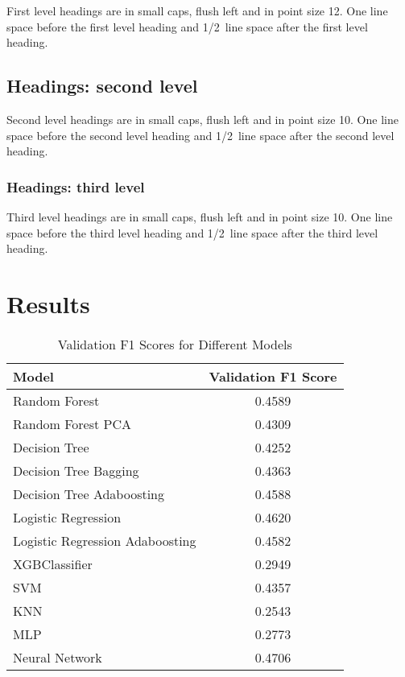 \documentclass{article} %
\begin{document}
First level headings are in small caps,
flush left and in point size 12. One line space before the first level
heading and 1/2~line space after the first level heading.

\subsection{Headings: second level}

Second level headings are in small caps,
flush left and in point size 10. One line space before the second level
heading and 1/2~line space after the second level heading.

\subsubsection{Headings: third level}

Third level headings are in small caps,
flush left and in point size 10. One line space before the third level
heading and 1/2~line space after the third level heading.


\section{Results}

\begin{table}[ht!]
    \centering
    \begin{tabular}{|l|c|}
        \hline
        \textbf{Model} & \textbf{Validation F1 Score} \\ \hline
        Random Forest & 0.4589 \\ \hline
        Random Forest PCA & 0.4309 \\ \hline
        Decision Tree & 0.4252 \\ \hline
        Decision Tree Bagging & 0.4363 \\ \hline
        Decision Tree Adaboosting & 0.4588 \\ \hline
        Logistic Regression & 0.4620 \\ \hline
        Logistic Regression Adaboosting & 0.4582 \\ \hline
        XGBClassifier & 0.2949 \\ \hline
        SVM & 0.4357 \\ \hline
        KNN & 0.2543 \\ \hline
        MLP & 0.2773 \\ \hline
        Neural Network & 0.4706 \\ \hline
    \end{tabular}
    \caption{Validation F1 Scores for Different Models }
    \label{tab:validation-f1-scores}
\end{table}
\end{document}
